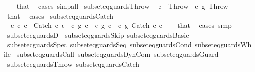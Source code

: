 \begin{isabellebody}
%
\isadelimproof
\ \ %
\endisadelimproof
%
\isatagproof
{}\isamarkupfalse%
\ that\ \isamarkupfalse%
\ cases\ simp{\isacharunderscore}all%
\endisatagproof
{\isafoldproof}%
%
\isadelimproof
\isanewline
%
\endisadelimproof
\isanewline
{}\isamarkupfalse%
\ subseteq{\isacharunderscore}guards{\isacharunderscore}Throw{\isacharcolon}\isanewline
\ \ {\isachardoublequoteopen}c\ {\isacharequal}\ Throw{\isachardoublequoteclose}\ \ {\isachardoublequoteopen}c\ {\isasymsubseteq}\isactrlsub g\ Throw{\isachardoublequoteclose}\isanewline
%
\isadelimproof
\ \ %
\endisadelimproof
%
\isatagproof
{}\isamarkupfalse%
\ that\ \isamarkupfalse%
\ cases%
\endisatagproof
{\isafoldproof}%
%
\isadelimproof
\isanewline
%
\endisadelimproof
\isanewline
{}\isamarkupfalse%
\ subseteq{\isacharunderscore}guards{\isacharunderscore}Catch{\isacharcolon}\isanewline
\ \ {\isachardoublequoteopen}{\isasymexists}c{}{\isacharprime}\ c{}{\isacharprime}{\isachardot}\ c\ {\isacharequal}\ Catch\ c{}{\isacharprime}\ c{}{\isacharprime}\ {\isasymand}\ {\isacharparenleft}c{}{\isacharprime}\ {\isasymsubseteq}\isactrlsub g\ c{}{\isacharparenright}\ {\isasymand}\ {\isacharparenleft}c{}{\isacharprime}\ {\isasymsubseteq}\isactrlsub g\ c{}{\isacharparenright}{\isachardoublequoteclose}\ \ {\isachardoublequoteopen}c\ {\isasymsubseteq}\isactrlsub g\ Catch\ c{}\ c{}{\isachardoublequoteclose}\isanewline
%
\isadelimproof
\ \ %
\endisadelimproof
%
\isatagproof
{}\isamarkupfalse%
\ that\ \isamarkupfalse%
\ cases\ simp%
\endisatagproof
{\isafoldproof}%
%
\isadelimproof
\isanewline
%
\endisadelimproof
\isanewline
{}\isamarkupfalse%
\ subseteq{\isacharunderscore}guardsD\ {\isacharequal}\ subseteq{\isacharunderscore}guards{\isacharunderscore}Skip\ subseteq{\isacharunderscore}guards{\isacharunderscore}Basic\isanewline
\ subseteq{\isacharunderscore}guards{\isacharunderscore}Spec\ subseteq{\isacharunderscore}guards{\isacharunderscore}Seq\ subseteq{\isacharunderscore}guards{\isacharunderscore}Cond\ subseteq{\isacharunderscore}guards{\isacharunderscore}While\isanewline
\ subseteq{\isacharunderscore}guards{\isacharunderscore}Call\ subseteq{\isacharunderscore}guards{\isacharunderscore}DynCom\ subseteq{\isacharunderscore}guards{\isacharunderscore}Guard\isanewline
\ subseteq{\isacharunderscore}guards{\isacharunderscore}Throw\ subseteq{\isacharunderscore}guards{\isacharunderscore}Catch\ \isanewline

\end{isabellebody}
